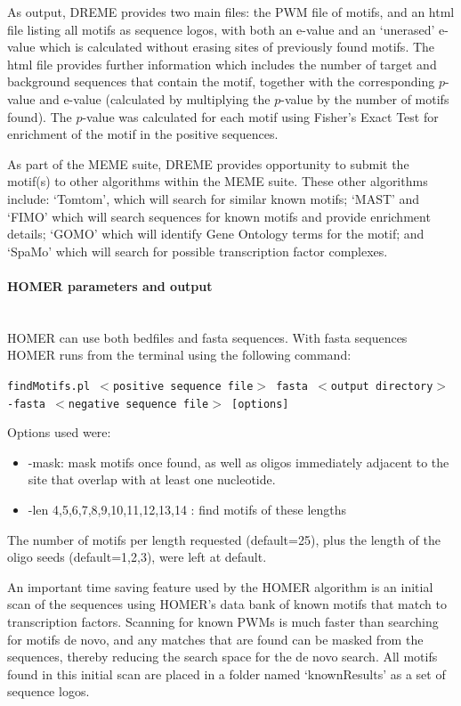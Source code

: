 \documentclass[12pt]{article}
\begin{document}
As output, DREME provides two main files: the PWM file of motifs, and an html file listing all motifs as sequence logos, with both an e-value and an `unerased' e-value which is calculated without erasing sites of previously found motifs. The html file provides further information which includes the number of target and background sequences that contain the motif, together with the corresponding $p$-value and e-value (calculated by multiplying the $p$-value by the number of motifs found). The $p$-value was calculated for each motif using Fisher's Exact Test for enrichment of the motif in the positive sequences.

As part of the MEME suite, DREME provides opportunity to submit the motif(s) to other algorithms within the MEME suite. These other algorithms include: `Tomtom', which will search for similar known motifs; `MAST' and `FIMO' which will search sequences for known motifs and provide enrichment details; `GOMO' which will identify Gene Ontology terms for the motif; and `SpaMo' which will search for possible transcription factor complexes.


\paragraph{HOMER parameters and output}\mbox{}\\
HOMER can use both bedfiles and fasta sequences. With fasta sequences HOMER runs from the terminal using the following command:

\texttt{findMotifs.pl $<$positive sequence file$>$ fasta $<$output directory$>$ -fasta $<$negative sequence file$>$ [options]}
 
 
Options used were:
\begin{itemize}
\item -mask: mask motifs once found, as well as oligos immediately adjacent to the site that overlap with at least one nucleotide.
\item -len 4,5,6,7,8,9,10,11,12,13,14 : find motifs of these lengths
\end{itemize}
The number of motifs per length requested (default=25), plus the length of the oligo seeds (default=1,2,3), were left at default.

An important time saving feature used by the HOMER algorithm is an initial scan of the sequences using HOMER's data bank of known motifs that match to transcription factors. Scanning for known PWMs is much faster than searching for motifs de novo, and any matches that are found can be masked from the sequences, thereby reducing the search space for the de novo search. All motifs found in this initial scan are placed in a folder named `knownResults' as a set of sequence logos.
\end{document}
